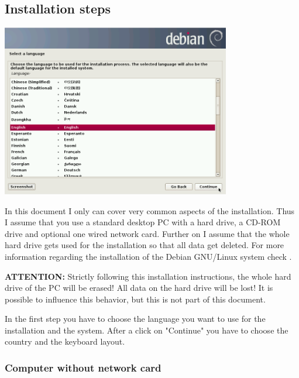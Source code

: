 \documentclass[a4paper,12pt,twoside]{article}
\begin{document}
\subsection{Installation steps}
\label{sct:inst_steps}

\begin{minipage}{\linewidth}
    \centering
    \includegraphics[width=10cm]{efaLiveen-img/efaLiveen-img4.png}
    \label{fig:inst_language}
\end{minipage}

In this document I only can cover very common aspects of the
installation. Thus I assume that you use a standard desktop PC with a
hard drive, a CD-ROM drive and optional one wired network card. Further
on I assume that the whole hard drive gets used for the installation so
that all data get deleted. For more information regarding the
installation of the Debian GNU/Linux system check \cite{DEB2}.

\textbf{ATTENTION:} Strictly following this installation instructions, the whole
hard drive of the PC will be erased! All data on the hard drive will be
lost! It is possible to influence this behavior, but this is not part
of this document.

In the first step you have to choose the language you want to use for
the installation and the system. After a click on
"Continue" you have to choose the country
and the keyboard layout.


\subsubsection{Computer without network card}
\label{sct:inst_no_net}
\end{document}
